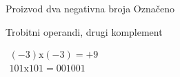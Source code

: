 
\begin{frame}[label=05-s042]{Proizvod dva negativna broja}
\fontsize{10}{12}\selectfont
Označeno\par Trobitni operandi, drugi komplement\par
$\begin{gathered}(-3)\mathrm{x}(-3)=+9\\101\mathrm{x}101=001001\end{gathered}$
\begin{center}\end{center}
\end{frame}

